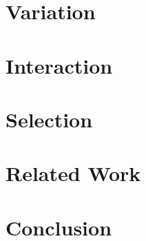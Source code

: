 \documentclass[jou,apacite]{apa6}
\begin{document}
\section{Variation}

\section{Interaction}

\section{Selection}

\section{Related Work}

\section{Conclusion}


\end{document}
